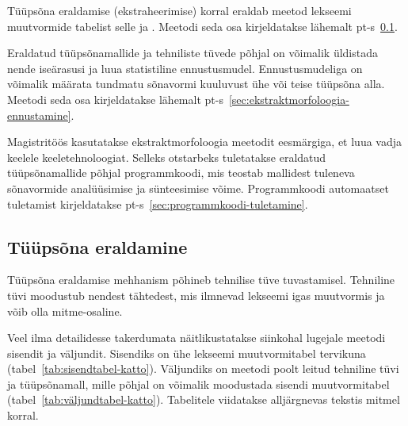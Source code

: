 \documentclass[12pt,a4paper]{article}
\begin{document}
Tüüpsõna eraldamise (ekstraheerimise) korral eraldab meetod lekseemi muutvormide tabelist selle  ja . Meetodi seda osa kirjeldatakse lähemalt pt-s~\ref{sec:ekstraktmorfoloogia-eraldamine}.

Eraldatud tüüpsõnamallide ja tehniliste tüvede põhjal on võimalik üldistada nende iseärasusi ja luua statistiline ennustus\-mudel. Ennustus\-mudeliga on võimalik määrata tundmatu sõnavormi kuuluvust ühe või teise tüüpsõna alla. Meetodi seda osa kirjeldatakse lähemalt pt-s~\ref{sec:ekstraktmorfoloogia-ennustamine}.

Magistritöös kasutatakse ekstraktmorfoloogia meetodit eesmärgiga, et luua vadja keelele keele\-tehnoloogiat. Selleks otstarbeks tuletatakse eraldatud tüüpsõna\-mallide põhjal programm\-koodi, mis teostab mallidest tuleneva sõnavormide analüüsimise ja sünteesimise võime. Programm\-koodi automaatset tuletamist kirjeldatakse pt-s~\ref{sec:programmkoodi-tuletamine}.






\subsection{Tüüpsõna eraldamine}
\label{sec:ekstraktmorfoloogia-eraldamine}
Tüüpsõna eraldamise mehhanism põhineb tehnilise tüve tuvastamisel. Tehniline tüvi moodustub nendest tähtedest, mis ilmnevad lekseemi igas muutvormis ja võib olla mitme-osaline.

Veel ilma detailidesse takerdumata näitlikustatakse siinkohal lugejale meetodi sisendit ja väljundit. Sisendiks on ühe lekseemi muutvormitabel tervikuna (tabel~\ref{tab:sisendtabel-katto}). Väljundiks on meetodi poolt leitud tehniline tüvi ja tüüp\-sõna\-mall, mille põhjal on võimalik moodustada sisendi muutvormi\-tabel (tabel~\ref{tab:väljundtabel-katto}). Tabelitele viidatakse alljärgnevas tekstis mitmel korral.
\end{document}
